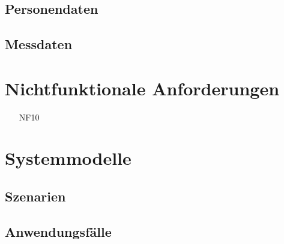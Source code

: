 \documentclass[a4paper,12pt]{article}
\begin{document}








\subsection{Personendaten}
\subsection{Messdaten}

\section{Nichtfunktionale Anforderungen}
\begin{itemize}[nosep]
\leftskip=0.5cm
\item[NF10]
\end{itemize}

\section{Systemmodelle}

\subsection{Szenarien}

\subsection{Anwendungsfälle}



\end{document}
